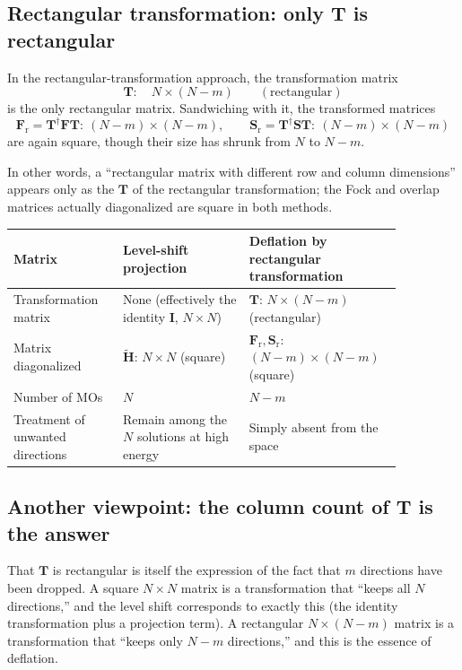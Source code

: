 \documentclass[11pt]{article}
\newcommand{\Hcore}{\mathbf H}
\newcommand{\Smat}{\mathbf S}
\newcommand{\Tmat}{\mathbf T}
\newcommand{\Fmat}{\mathbf F}
\newcommand{\Fr}{\mathbf F_{\mathrm r}}
\newcommand{\Sr}{\mathbf S_{\mathrm r}}
\begin{document}
\subsection{Rectangular transformation: only \(\Tmat\) is rectangular}

In the rectangular-transformation approach, the transformation matrix
\[
  \Tmat:\quad N\times(N-m)\qquad(\text{rectangular})
\]
is the only rectangular matrix. Sandwiching with it, the transformed
matrices
\[
  \Fr=\Tmat^\dagger\Fmat\Tmat:\ (N-m)\times(N-m),\qquad
  \Sr=\Tmat^\dagger\Smat\Tmat:\ (N-m)\times(N-m)
\]
are again square, though their size has shrunk from \(N\) to
\(N-m\).

In other words, a ``rectangular matrix with different row and column
dimensions'' appears only as the \(\Tmat\) of the rectangular
transformation; the Fock and overlap matrices actually diagonalized are
square in both methods.

\begin{center}
\begin{tabular}{|p{0.26\linewidth}|p{0.3\linewidth}|p{0.3\linewidth}|}
\hline
\textbf{Matrix} & \textbf{Level-shift projection} &
\textbf{Deflation by rectangular transformation} \\
\hline
Transformation matrix & None (effectively the identity \(\mathbf I\),
\(N\times N\)) &
\(\Tmat\): \(N\times(N-m)\) (rectangular) \\
\hline
Matrix diagonalized & \(\widetilde{\Hcore}\): \(N\times N\) (square) &
\(\Fr,\Sr\): \((N-m)\times(N-m)\) (square) \\
\hline
Number of MOs & \(N\) & \(N-m\) \\
\hline
Treatment of unwanted directions & Remain among the \(N\) solutions at
high energy & Simply absent from the space \\
\hline
\end{tabular}
\end{center}

\subsection{Another viewpoint: the column count of \(\Tmat\) is the
answer}

That \(\Tmat\) is rectangular is itself the expression of the fact that
\(m\) directions have been dropped. A square \(N\times N\) matrix is a
transformation that ``keeps all \(N\) directions,'' and the level shift
corresponds to exactly this (the identity transformation plus a
projection term). A rectangular \(N\times(N-m)\) matrix is a
transformation that ``keeps only \(N-m\) directions,'' and this is the
essence of deflation.
\end{document}
